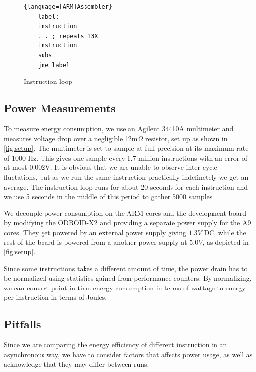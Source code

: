 \begin{figure}
    \begin{lstlisting}{language=[ARM]Assembler}
    label:
    instruction
    ... ; repeats 13X
    instruction
    subs
    jne label
    \end{lstlisting}
    \caption{Instruction loop}
    \label{list:inst_loop}
\end{figure}

\subsection{Power Measurements}
To measure energy consumption, we use an Agilent 34410A
multimeter\cite{agilent34410a} and measures voltage drop over a negligible 12m$\Omega$
resistor, set up as shown in \autoref{fig:setup}. The multimeter is
set to sample at full precision at its maximum rate of 1000 Hz. This gives one
sample every 1.7 million instructions with an error of at most 0.002V. It is
obvious that we are unable to observe inter-cycle fluctations, but as we run the
same instruction practically indefinetely we get an average. The instruction
loop runs for about 20 seconds for each instruction and we use 5 seconds in the
middle of this period to gather 5000 samples.

We decouple power consumption on the ARM cores and the development board by
modifying the ODROID-X2 and providing a separate power supply for the A9 cores.
They get powered by an external power supply giving $1.3V$ DC, while the rest of
the board is powered from a another power supply at $5.0V$, as depicted in
\autoref{fig:setup}.

Since some instructions takes a different amount of time, the power drain has to
be normalized using statistics gained from performance counters. By normalizing,
we can convert point-in-time energy consumption in terms of wattage to energy
per instruction in terms of Joules.


\subsection{Pitfalls}
Since we are comparing the energy efficiency of different instruction in an
asynchronous way, we have to consider factors that affects power usage, as well
as acknowledge that they may differ between runs.


